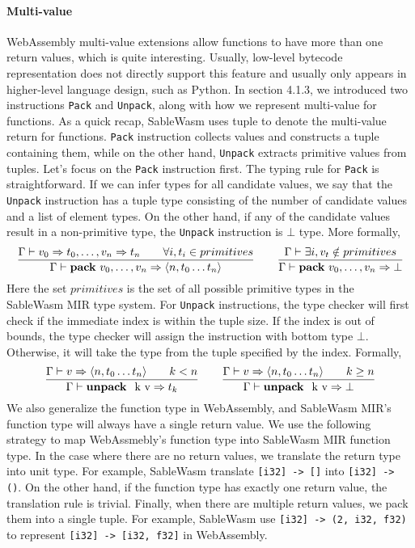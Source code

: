 \paragraph{Multi-value} WebAssembly multi-value extensions allow functions to have more than one return values, which is quite interesting. Usually, low-level bytecode representation does not directly support this feature and usually only appears in higher-level language design, such as Python. In section 4.1.3, we introduced two instructions \texttt{Pack} and \texttt{Unpack}, along with how we represent multi-value for functions. As a quick recap, SableWasm uses tuple to denote the multi-value return for functions. \texttt{Pack} instruction collects values and constructs a tuple containing them, while on the other hand, \texttt{Unpack} extracts primitive values from tuples. Let's focus on the \texttt{Pack} instruction first. The typing rule for \texttt{Pack} is straightforward. If we can infer types for all candidate values, we say that the \texttt{Unpack} instruction has a tuple type consisting of the number of candidate values and a list of element types. On the other hand, if any of the candidate values result in a non-primitive type, the \texttt{Unpack} instruction is $\bot$ type. More formally,
$$
    \frac{\Gamma \vdash v_0 \Rightarrow t_0, \dots, v_n \Rightarrow t_n \qquad \forall i, t_i \in primitives}{\Gamma \vdash \text{\textbf{pack} } v_0, \dots, v_n \Rightarrow \langle n, t_0 \dots t_n \rangle}
    \qquad
    \frac{\Gamma \vdash \exists i, v_t \notin primitives}{\Gamma \vdash \text{\textbf{pack} } v_0, \dots, v_n \Rightarrow \bot}
$$
Here the set $primitives$ is the set of all possible primitive types in the SableWasm MIR type system. For \texttt{Unpack} instructions, the type checker will first check if the immediate index is within the tuple size. If the index is out of bounds, the type checker will assign the instruction with bottom type $\bot$. Otherwise, it will take the type from the tuple specified by the index. Formally,
$$
    \frac{\Gamma \vdash v \Rightarrow \langle n, t_0 \dots t_n \rangle \qquad k < n}{\Gamma \vdash \text{\textbf{unpack } k v} \Rightarrow t_k}
    \qquad
    \frac{\Gamma \vdash v \Rightarrow \langle n, t_0 \dots t_n \rangle \qquad k \geq n}{\Gamma \vdash \text{\textbf{unpack } k v} \Rightarrow \bot}
$$
We also generalize the function type in WebAssembly, and SableWasm MIR's function type will always have a single return value. We use the following strategy to map WebAssmebly's function type into SableWasm MIR function type. In the case where there are no return values, we translate the return type into unit type. For example, SableWasm translate \texttt{[i32] -> []} into \texttt{[i32] -> ()}. On the other hand, if the function type has exactly one return value, the translation rule is trivial. Finally, when there are multiple return values, we pack them into a single tuple. For example, SableWasm use \texttt{[i32] -> (2, i32, f32)} to represent \texttt{[i32] -> [i32, f32]}  in WebAssembly.

